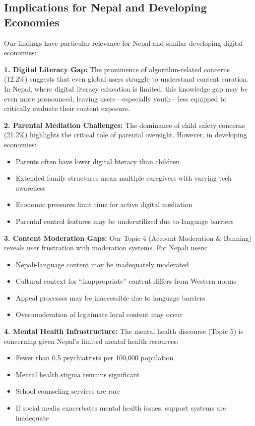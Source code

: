 \documentclass[11pt,a4paper]{article}
\begin{document}
\subsection{Implications for Nepal and Developing Economies}

Our findings have particular relevance for Nepal and similar developing digital economies:

\textbf{1. Digital Literacy Gap:} The prominence of algorithm-related concerns (12.2\%) suggests that even global users struggle to understand content curation. In Nepal, where digital literacy education is limited, this knowledge gap may be even more pronounced, leaving users---especially youth---less equipped to critically evaluate their content exposure.

\textbf{2. Parental Mediation Challenges:} The dominance of child safety concerns (21.2\%) highlights the critical role of parental oversight. However, in developing economies:
\begin{itemize}[itemsep=0.2em]
    \item Parents often have lower digital literacy than children
    \item Extended family structures mean multiple caregivers with varying tech awareness
    \item Economic pressures limit time for active digital mediation
    \item Parental control features may be underutilized due to language barriers
\end{itemize}

\textbf{3. Content Moderation Gaps:} Our Topic 4 (Account Moderation \& Banning) reveals user frustration with moderation systems. For Nepali users:
\begin{itemize}[itemsep=0.2em]
    \item Nepali-language content may be inadequately moderated
    \item Cultural context for ``inappropriate'' content differs from Western norms
    \item Appeal processes may be inaccessible due to language barriers
    \item Over-moderation of legitimate local content may occur
\end{itemize}

\textbf{4. Mental Health Infrastructure:} The mental health discourse (Topic 5) is concerning given Nepal's limited mental health resources:
\begin{itemize}[itemsep=0.2em]
    \item Fewer than 0.5 psychiatrists per 100,000 population
    \item Mental health stigma remains significant
    \item School counseling services are rare
    \item If social media exacerbates mental health issues, support systems are inadequate
\end{itemize}
\end{document}
